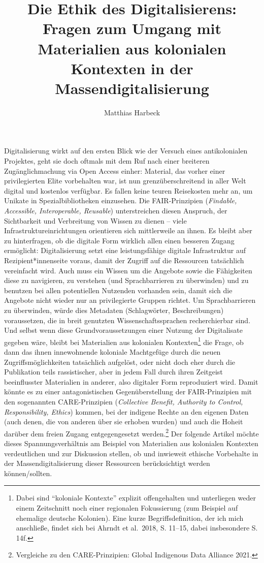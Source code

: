 \documentclass[a4paper,
fontsize=11pt,
oneside,
numbers=noperiodatend,
parskip=half-,
bibliography=totoc,
final
]{scrartcl}
\title{\LARGE{Die Ethik des Digitalisierens: Fragen zum Umgang mit Materialien aus kolonialen Kontexten in der Massendigitalisierung}}%
\author{Matthias Harbeck} %
\date{}
\begin{document}
\maketitle
\thispagestyle{fancyplain} 


Digitalisierung wirkt auf den ersten Blick wie der Versuch eines
antikolonialen Projektes, geht sie doch oftmals mit dem Ruf nach einer
breiteren Zugänglichmachung via Open Access einher: Material, das vorher
einer privilegierten Elite vorbehalten war, ist nun grenzüberschreitend
in aller Welt digital und kostenlos verfügbar. Es fallen keine teuren
Reisekosten mehr an, um Unikate in Spezialbibliotheken einzusehen. Die
FAIR-Prinzipien (\emph{Findable, Accessible, Interoperable, Reusable})
unterstreichen diesen Anspruch, der Sichtbarkeit und Verbreitung von
Wissen zu dienen -- viele Infrastruktureinrichtungen orientieren sich
mittlerweile an ihnen. Es bleibt aber zu hinterfragen, ob die digitale
Form wirklich allen einen besseren Zugang ermöglicht: Digitalisierung
setzt eine leistungsfähige digitale Infrastruktur auf
Rezipient*innenseite voraus, damit der Zugriff auf die Ressourcen
tatsächlich vereinfacht wird. Auch muss ein Wissen um die Angebote sowie
die Fähigkeiten diese zu navigieren, zu verstehen (und Sprachbarrieren
zu überwinden) und zu benutzen bei allen potentiellen Nutzenden
vorhanden sein, damit sich die Angebote nicht wieder nur an
privilegierte Gruppen richtet. Um Sprachbarrieren zu überwinden, würde
dies Metadaten (Schlagwörter, Beschreibungen) voraussetzen, die in breit
genutzten Wissenschaftssprachen recherchierbar sind. Und selbst wenn
diese Grundvoraussetzungen einer Nutzung der Digitalisate gegeben wäre,
bleibt bei Materialien aus kolonialen Kontexten\footnote{Dabei sind
  \enquote{koloniale Kontexte} explizit offengehalten und unterliegen
  weder einem Zeitschnitt noch einer regionalen Fokussierung (zum
  Beispiel auf ehemalige deutsche Kolonien). Eine kurze
  Begriffsdefinition, der ich mich anschließe, findet sich bei Ahrndt et
  al.~2018, S. 11--15, dabei insbesondere S. 14f.} die Frage, ob dann
das ihnen innewohnende koloniale Machtgefüge durch die neuen
Zugriffsmöglichkeiten tatsächlich aufgelöst, oder nicht doch eher durch
die Publikation teils rassistischer, aber in jedem Fall durch ihren
Zeitgeist beeinflusster Materialien in anderer, also digitaler Form
reproduziert wird. Damit könnte es zu einer antagonistischen
Gegenüberstellung der FAIR-Prinzipien mit den sogenannten
CARE-Prinzipien (\emph{Collective Benefit, Authority to Control,
Responsibility, Ethics}) kommen, bei der indigene Rechte an den eigenen
Daten (auch denen, die von anderen über sie erhoben wurden) und auch die
Hoheit darüber dem freien Zugang entgegengesetzt werden.\footnote{Vergleiche
  zu den CARE-Prinzipien: Global Indigenous Data Alliance 2021.} Der
folgende Artikel möchte dieses Spannungsverhältnis am Beispiel von
Materialien aus kolonialen Kontexten verdeutlichen und zur Diskussion
stellen, ob und inwieweit ethische Vorbehalte in der
Massendigitalisierung dieser Ressourcen berücksichtigt werden
können/sollten.
\end{document}
